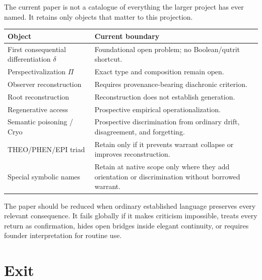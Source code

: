 \documentclass[11pt]{article}
\begin{document}
The current paper is not a catalogue of everything the larger project has ever named. It retains only objects that matter to this projection.

\begin{center}
\begin{tabularx}{0.96\textwidth}{lX}
\toprule
Object & Current boundary \\
\midrule
First consequential differentiation $\delta$ & Foundational open problem; no Boolean/qutrit shortcut. \\
Perspectivalization $\Pi$ & Exact type and composition remain open. \\
Observer reconstruction & Requires provenance-bearing diachronic criterion. \\
Root reconstruction & Reconstruction does not establish generation. \\
Regenerative access & Prospective empirical operationalization. \\
Semantic poisoning / Cryo & Prospective discrimination from ordinary drift, disagreement, and forgetting. \\
THEO/PHEN/EPI triad & Retain only if it prevents warrant collapse or improves reconstruction. \\
Special symbolic names & Retain at native scope only where they add orientation or discrimination without borrowed warrant. \\
\bottomrule
\end{tabularx}
\end{center}

The paper should be reduced when ordinary established language preserves every relevant consequence. It fails globally if it makes criticism impossible, treats every return as confirmation, hides open bridges inside elegant continuity, or requires founder interpretation for routine use.

\section{Exit}
\end{document}
